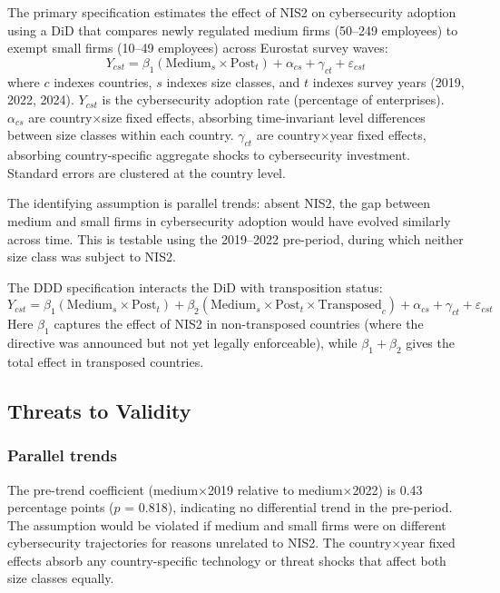\documentclass[12pt]{article}
\begin{document}
The primary specification estimates the effect of NIS2 on cybersecurity adoption using a DiD that compares newly regulated medium firms (50--249 employees) to exempt small firms (10--49 employees) across Eurostat survey waves:
\begin{equation}
Y_{cst} = \beta_1 (\text{Medium}_s \times \text{Post}_t) + \alpha_{cs} + \gamma_{ct} + \varepsilon_{cst}
\label{eq:did}
\end{equation}
where $c$ indexes countries, $s$ indexes size classes, and $t$ indexes survey years (2019, 2022, 2024). $Y_{cst}$ is the cybersecurity adoption rate (percentage of enterprises). $\alpha_{cs}$ are country$\times$size fixed effects, absorbing time-invariant level differences between size classes within each country. $\gamma_{ct}$ are country$\times$year fixed effects, absorbing country-specific aggregate shocks to cybersecurity investment. Standard errors are clustered at the country level.

The identifying assumption is parallel trends: absent NIS2, the gap between medium and small firms in cybersecurity adoption would have evolved similarly across time. This is testable using the 2019--2022 pre-period, during which neither size class was subject to NIS2.

The DDD specification interacts the DiD with transposition status:
\begin{equation}
Y_{cst} = \beta_1 (\text{Medium}_s \times \text{Post}_t) + \beta_2 (\text{Medium}_s \times \text{Post}_t \times \text{Transposed}_c) + \alpha_{cs} + \gamma_{ct} + \varepsilon_{cst}
\label{eq:ddd}
\end{equation}
Here $\beta_1$ captures the effect of NIS2 in non-transposed countries (where the directive was announced but not yet legally enforceable), while $\beta_1 + \beta_2$ gives the total effect in transposed countries.

\subsection{Threats to Validity}

\subsubsection*{Parallel trends} The pre-trend coefficient (medium$\times$2019 relative to medium$\times$2022) is 0.43 percentage points ($p$ = 0.818), indicating no differential trend in the pre-period. The assumption would be violated if medium and small firms were on different cybersecurity trajectories for reasons unrelated to NIS2. The country$\times$year fixed effects absorb any country-specific technology or threat shocks that affect both size classes equally.
\end{document}
